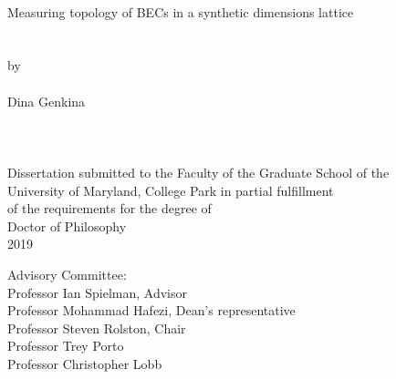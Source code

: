
\thispagestyle{empty}
\hbox{\ }
\vspace{1in}
\renewcommand{\baselinestretch}{1}
\small\normalsize
\begin{center}

\large{{Measuring topology of BECs in a synthetic dimensions lattice}}\\
\ \\
\ \\
\large{by} \\
\ \\
\large{Dina Genkina}%
\ \\
\ \\
\ \\
\ \\
\normalsize
Dissertation submitted to the Faculty of the Graduate School of the \\
University of Maryland, College Park in partial fulfillment \\
of the requirements for the degree of \\
Doctor of Philosophy \\
2019
\end{center}

\vspace{7.5em}

\noindent Advisory Committee: \\
Professor Ian Spielman, Advisor \\
Professor Mohammad Hafezi, Dean's representative\\
Professor Steven Rolston, Chair\\
Professor Trey Porto\\
Professor Christopher Lobb

